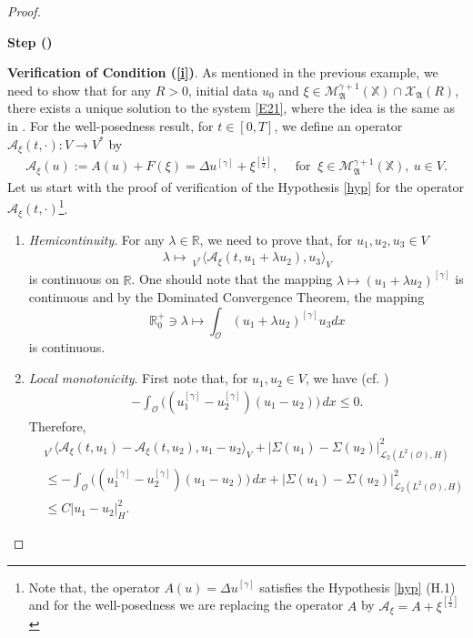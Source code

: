 \documentclass[english,a4paper,11pt]{amsart}
\theoremstyle{plain}
\theoremstyle{definition}
\theoremstyle{remark}
\renewcommand{\emph}[1]{{\sl #1}}
\numberwithin{equation}{section}
\newcounter{lil1}
\newenvironment{step}
{\begin{list} { \bf Step (\Roman{lil1})}
		{ \usecounter{lil1}
			\setlength{\leftmargin}{0.0cm}
			\setlength{\topsep}{0.2cm}
			\setlength{\itemsep}{0.0cm}
			\setlength{\parsep}{0.1cm}
			\setlength{\itemindent}{0.8cm}
			\setlength{\parskip}{0.0cm}}}
	{\end{list}}
\newcounter{lil33}
\newcounter{lil1q}
\newcommand{\CO}{{{ \mathcal O }}}
\newcommand{\CA}{{{ \mathcal A }}}
\newcommand{\Mcal} {{\mathcal M}}
\newcommand{\Ocal} {{\mathcal O}}
\newcommand{\Xcal} {{\mathcal X}}
\newcommand{\Afrak} {{\mathfrak A}}
\newcommand{\R}{\mathbb{R}}
\newcommand{\X}{\mathbb{X}}
\renewcommand{\emph}[1]{{\sl #1}}
\begin{document}
\begin{proof}
\begin{step}
	\item
\textbf{Verification of Condition (\ref{i})}. As mentioned in the previous example, we need to show that for any $R>0$, initial data $u_0$ and $\xi\in \Mcal_{\Afrak}^{\gamma+1}(\X)\cap \Xcal_{\Afrak}(R)$, there exists a unique solution to the system \eqref{E21}, where the idea is the same as in \cite[Theorem 5.1.3]{weiroeckner}.
For the well-posedness result, for $t\in[0,T]$, we define an operator 
$\CA_\xi(t,\cdot):V \to V^\ast$ by 
\begin{align*}
	\CA_\xi (u):= A(u)+ F(\xi)= \Delta u^{[\gamma]}+\xi^{[\frac{1}{2}]}, \quad \text{ for } \ \xi\in \Mcal_{\Afrak}^{\gamma+1}(\X),\ u\in V. 
\end{align*} 
 Let us start with the proof of verification of the Hypothesis \ref{hyp} for the operator $\CA_\xi(t,\cdot)$\footnote{Note that, the operator $A(u)=\Delta u^{[\gamma]}$ satisfies the Hypothesis \ref{hyp} (H.1) and for the well-posedness we are replacing the operator $A$ by $\mathcal{A}_\xi=A+\xi^{[\frac{1}{2}]}$ }. 
\begin{enumerate}
	\item \emph{Hemicontinuity}. For any $\lambda\in\R$, we need to prove that, for $u_1,u_2,u_3\in V$ 
	\begin{align*}
		\lambda\mapsto\ _{V^\ast}\langle \CA_\xi(t,u_1+\lambda u_2), u_3\rangle_{V}
	\end{align*}
is continuous on $\R$. One should note that the mapping $\lambda\mapsto (u_1+\lambda u_2)^{[\gamma]}$ is continuous and by the Dominated Convergence Theorem, the mapping 
$$\R_0^+\ni \lambda \mapsto \int_\Ocal (u_1+\lambda u_2)^{[\gamma]}u_3dx$$
 is continuous.
	
	
	
	\item \emph{Local monotonicity}. First note that, for $u_1,u_2\in V$, we have (cf. \cite[pp. 87]{weiroeckner})
	\begin{align*}
		-\int_\Ocal \Big((u_1^{[\gamma]}-u_2^{[\gamma]})(u_1-u_2)\Big)\, dx \leq 0.
	\end{align*}Therefore, 
	\begin{align*}
	&	_{V^\ast}\langle \CA_\xi(t,u_1)-\CA_\xi(t,u_2), u_1-u_2\rangle _{V}+ | \Sigma(u_1)-\Sigma(u_2) | _{\mathcal{L}_2(L^2(\CO),H)}^2 
	\\& \leq  	-\int_\Ocal \Big((u_1^{[\gamma]}-u_2^{[\gamma]})(u_1-u_2)\Big)\, dx + | \Sigma(u_1)-\Sigma(u_2) | _{\mathcal{L}_2(L^2(\CO),H)}^2 \\&
	\leq C | u_1-u_2 | _{H}^2 .
		\end{align*} 


\end{enumerate}
\end{step}
\end{proof}
\end{document}
